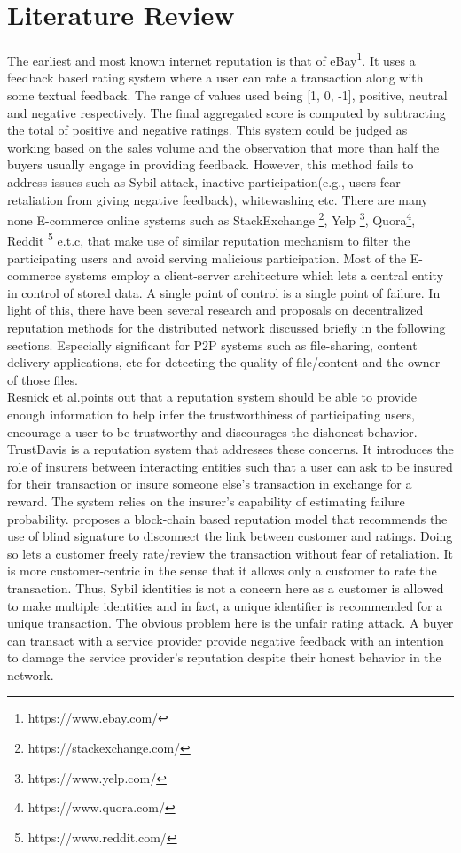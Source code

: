 \chapter{Literature Review}\label{ch:litrev}
The earliest and most known internet reputation is that of
eBay\footnote{https://www.ebay.com/}. It uses a feedback based rating system
where a user can rate a transaction along with some textual feedback. The range
of values used being [1, 0, -1], positive, neutral and negative respectively.
The final aggregated score is computed by subtracting the total of positive and
negative ratings. This system \cite{resnick2002trust} \cite{resnick2006value}
could be judged as working based on the sales volume and the observation that
more than half the buyers usually engage in providing feedback. However, this
method fails to address issues such as Sybil attack, inactive
participation(e.g., users fear retaliation from giving negative feedback),
whitewashing etc. There are many none E-commerce online systems such as
StackExchange \footnote{https://stackexchange.com/}, Yelp
\footnote{https://www.yelp.com/}, Quora\footnote{https://www.quora.com/},
Reddit \footnote{https://www.reddit.com/} e.t.c, that make use of similar
reputation mechanism to filter the participating users and avoid serving
malicious participation. Most of the E-commerce systems employ a client-server
architecture which lets a central entity in control of stored data.  A single
point of control is a single point of failure. In light of this, there have
been several research and proposals on decentralized reputation methods for the
distributed network discussed briefly in the following sections. Especially
significant for P2P systems such as file-sharing, content delivery
applications, etc for detecting the quality of file/content and the owner of
those files.\\
Resnick et al.\cite{resnick2000reputation}points out that a reputation system
should be able to provide enough information to help infer the trustworthiness
of participating users, encourage a user to be trustworthy and discourages the
dishonest behavior. TrustDavis \cite{defigueiredo2005trustdavis} is a
reputation system that addresses these concerns. It introduces the role of
insurers between interacting entities such that a user can ask to be insured
for their transaction or insure someone else's transaction in exchange for a
reward. The system relies on the insurer's capability of estimating failure
probability.  \cite{schaub2016trustless} proposes a block-chain based
reputation model that recommends the use of blind signature to disconnect
the link between customer and ratings. Doing so lets a customer freely
rate/review the transaction without fear of retaliation. It is more
customer-centric in the sense that it allows only a customer to rate the
transaction. Thus, Sybil identities is not a concern here as a customer is
allowed to make multiple identities and in fact, a unique identifier is
recommended for a unique transaction. The obvious problem here is the unfair
rating attack. A buyer can transact with a service provider provide negative
feedback with an intention to damage the service provider's reputation despite
their honest behavior in the network. 


